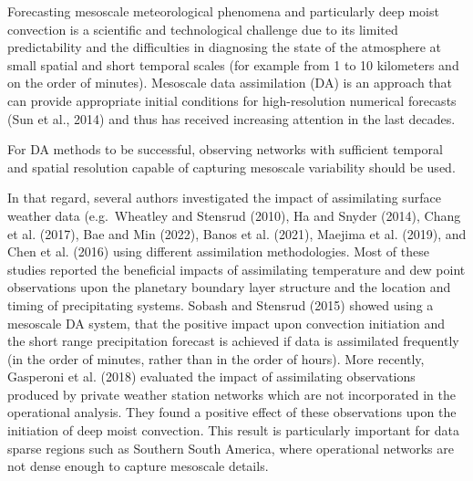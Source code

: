 \documentclass[final,5p,times,twocolumn,authoryear]{elsarticle} %
\begin{document}
Forecasting mesoscale meteorological phenomena and particularly deep moist convection is a scientific and technological challenge due to its limited predictability and the difficulties in diagnosing the state of the atmosphere at small spatial and short temporal scales (for example from 1 to 10 kilometers and on the order of minutes). Mesoscale data assimilation (DA) is an approach that can provide appropriate initial conditions for high-resolution numerical forecasts (Sun et al., 2014) and thus has received increasing attention in the last decades.

For DA methods to be successful, observing networks with sufficient temporal and spatial resolution capable of capturing mesoscale variability should be used.

In that regard, several authors investigated the impact of assimilating surface weather data (e.g.~Wheatley and Stensrud (2010), Ha and Snyder (2014), Chang et al. (2017), Bae and Min (2022), Banos et al. (2021), Maejima et al. (2019), and Chen et al. (2016) using different assimilation methodologies. Most of these studies reported the beneficial impacts of assimilating temperature and dew point observations upon the planetary boundary layer structure and the location and timing of precipitating systems. Sobash and Stensrud (2015) showed using a mesoscale DA system, that the positive impact upon convection initiation and the short range precipitation forecast is achieved if data is assimilated frequently (in the order of minutes, rather than in the order of hours). More recently, Gasperoni et al. (2018) evaluated the impact of assimilating observations produced by private weather station networks which are not incorporated in the operational analysis. They found a positive effect of these observations upon the initiation of deep moist convection. This result is particularly important for data sparse regions such as Southern South America, where operational networks are not dense enough to capture mesoscale details.
\end{document}
